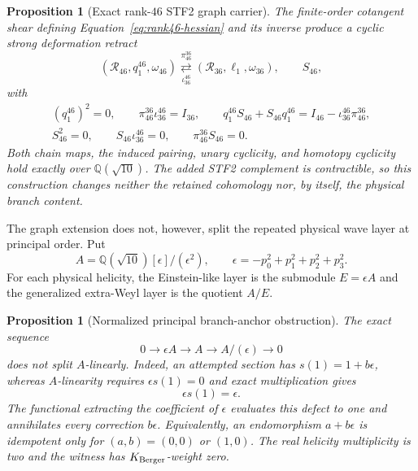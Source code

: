 \documentclass[11pt]{article}
\newtheorem{proposition}[theorem]{Proposition}
\theoremstyle{definition}
\theoremstyle{remark}
\newcommand{\Q}{\mathbb Q}
\newcommand{\cR}{\mathcal R}
\begin{document}
\begin{proposition}[Exact rank-$46$ STF2 graph carrier]
The finite-order cotangent shear defining Equation~\eqref{eq:rank46-hessian}
and its inverse produce a cyclic strong deformation retract
\begin{equation}
 (\cR_{46},q_1^{46},\omega_{46})
 \underset{\iota_{36}^{46}}{\overset{\pi_{46}^{36}}{\rightleftarrows}}
 (\cR_{36},\ell_1,\omega_{36}),\qquad S_{46},
\end{equation}
with
\[
\begin{gathered}
 (q_1^{46})^2=0,\qquad
 \pi_{46}^{36}\iota_{36}^{46}=I_{36},\qquad
 q_1^{46}S_{46}+S_{46}q_1^{46}
   =I_{46}-\iota_{36}^{46}\pi_{46}^{36},\\
 S_{46}^2=0,\qquad S_{46}\iota_{36}^{46}=0,\qquad
 \pi_{46}^{36}S_{46}=0.
\end{gathered}
\]
Both chain maps, the induced pairing, unary cyclicity, and homotopy cyclicity
hold exactly over $\Q(\sqrt{10})$.  The added STF2 complement is contractible,
so this construction changes neither the retained cohomology nor, by itself,
the physical branch content.
\end{proposition}

The graph extension does not, however, split the repeated physical wave layer
at principal order.  Put
\begin{equation}
 A=\Q(\sqrt{10})[\epsilon]/(\epsilon^2),\qquad
 \epsilon=-p_0^2+p_1^2+p_2^2+p_3^2.
\end{equation}
For each physical helicity, the Einstein-like layer is the submodule
$E=\epsilon A$ and the generalized extra-Weyl layer is the quotient $A/E$.

\begin{proposition}[Normalized principal branch-anchor obstruction]
The exact sequence
\begin{equation}
 0\longrightarrow \epsilon A\longrightarrow A
 \longrightarrow A/(\epsilon)\longrightarrow0
\end{equation}
does not split $A$-linearly.  Indeed, an attempted section has
$s(1)=1+b\epsilon$, whereas $A$-linearity requires
$\epsilon s(1)=0$ and exact multiplication gives
\begin{equation}
 \epsilon s(1)=\epsilon.
\end{equation}
The functional extracting the coefficient of $\epsilon$ evaluates this
defect to one and annihilates every correction $b\epsilon$.  Equivalently, an
endomorphism $a+b\epsilon$ is idempotent only for $(a,b)=(0,0)$ or $(1,0)$.
The real helicity multiplicity is two and the witness has
$K_{\rm Berger}$-weight zero.
\end{proposition}
\end{document}
